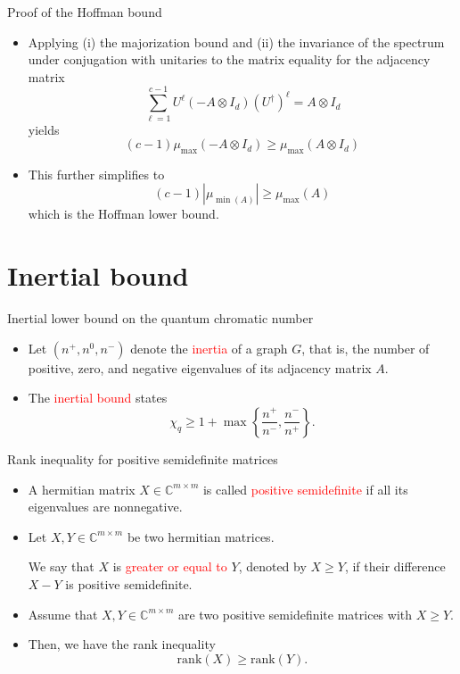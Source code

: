 \documentclass{beamer}
\newcommand{\C}{\mathbb{C}}
\renewcommand{\>}{\rangle}
\newcommand{\<}{\langle}
\begin{document}
%

\begin{frame}{Proof of the Hoffman bound}
\begin{itemize}
\item Applying (i) the majorization bound and (ii) the invariance of the spectrum under conjugation with unitaries to the 
matrix equality for the adjacency matrix
\[
\sum_{\ell=1}^{c-1} U^\ell (-A\otimes I_d) (U^\dagger)^\ell = A \otimes I_d
\]
yields 
\[
(c-1) \mu_{\max}(-A \otimes I_d) \ge \mu_{\max}(A\otimes I_d)
\]
\item This further simplifies to
\[
(c-1) |\mu_{\min(A)}| \ge \mu_{\max}(A)
\]
which is the Hoffman lower bound.
\end{itemize}
\end{frame}

%

\section{Inertial bound}

\begin{frame}{Inertial lower bound on the quantum chromatic number}

\begin{itemize}
\item Let $(n^+, n^0, n^-)$ denote the \textcolor{red}{inertia} of a graph $G$, that is, the number of positive, zero, and negative eigenvalues of its adjacency matrix $A$.

\item The \textcolor{red}{inertial bound} states
\[
\chi_q \ge 1 + \max \left\{ \frac{n^+}{n^-}, \frac{n^-}{n^+} \right\}.
\]
\end{itemize}

\end{frame}

%

\begin{frame}{Rank inequality for positive semidefinite matrices}
\begin{itemize}
\item A hermitian matrix $X\in\C^{m\times m}$ is called \textcolor{red}{positive semidefinite} if all its eigenvalues are nonnegative.

\item Let $X,Y\in\C^{m\times m}$ be two hermitian matrices. 

\medskip
We say that $X$ is \textcolor{red}{greater or equal to} $Y$, denoted by $X\ge Y$, if their difference $X-Y$ is positive semidefinite.

\medskip
\item Assume that $X,Y\in\C^{m\times m}$ are two positive semidefinite matrices with $X\ge Y$.

\item Then, we have the rank inequality
\[
\mathrm{rank}(X) \ge \mathrm{rank}(Y).
\]
\end{itemize}
\end{frame}
\end{document}
